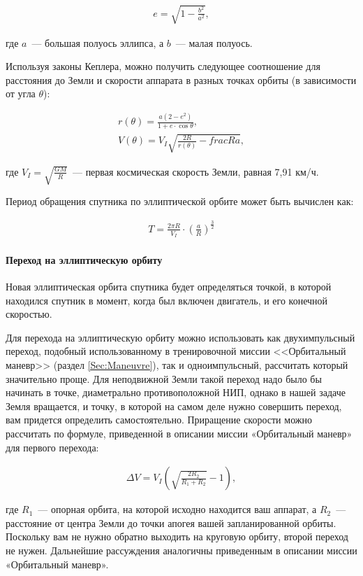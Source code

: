 \documentclass[12pt,a4paper]{article}
\begin{document}
\begin{eqnarray}
  e = \sqrt{1 - \frac{b^2}{a^2}},
\end{eqnarray}

где $a$~--- большая полуось эллипса, а $b$~--- малая полуось.

Используя законы Кеплера, можно получить следующее соотношение для расстояния до Земли и
скорости аппарата в разных точках орбиты (в зависимости от угла $\theta$):

\begin{eqnarray}
  r(\theta) = \frac{a (2 - e^2)}{1 + e \cdot \cos\theta},\\
  V(\theta) = V_I \sqrt{\frac{2 R}{r(\theta)} - frac{R}{a}},
\end{eqnarray}

где $V_I = \sqrt{\frac{G M}{R}}$~--- первая космическая скорость Земли, равная 7,91 км/ч.

Период обращения спутника по эллиптической орбите может быть вычислен как:

\begin{eqnarray}
  T = \frac{2 \pi R}{V_I} \cdot \left( \frac{a}{R} \right)^{\frac{3}{2}}
\end{eqnarray}

\paragraph{Переход на эллиптическую орбиту}

Новая эллиптическая орбита спутника будет определяться точкой, в которой находился спутник
в момент, когда был включен двигатель, и его конечной скоростью.

Для перехода на эллиптическую орбиту можно использовать как двухимпульсный переход,
подобный использованному в тренировочной миссии <<Орбитальный маневр>> (раздел
\ref{Sec:Maneuvre}), так и одноимпульсный, рассчитать который значительно проще. Для
неподвижной Земли такой переход надо было бы начинать в точке, диаметрально
противоположной НИП, однако в нашей задаче Земля вращается, и точку, в которой на самом
деле нужно совершить переход, вам придется определить самостоятельно.  Приращение скорости
можно рассчитать по формуле, приведенной в описании миссии «Орбитальный маневр» для
первого перехода:

\begin{eqnarray}
  \Delta V = V_I \left(\sqrt{\frac{2 R_2}{R_1 + R_2}} - 1 \right),
\end{eqnarray}

где $R_1$~--- опорная орбита, на которой исходно находится ваш аппарат, а $R_2$~---
расстояние от центра Земли до точки апогея вашей запланированной орбиты. Поскольку вам не
нужно обратно выходить на круговую орбиту, второй переход не нужен. Дальнейшие рассуждения
аналогичны приведенным в описании миссии «Орбитальный маневр».
\end{document}
